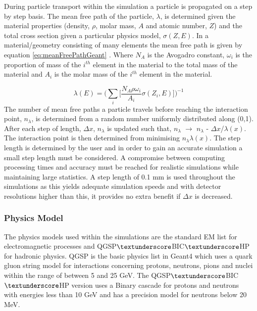 During particle transport within the simulation a particle is propagated on a step by step basis. The mean free path of the particle, $\lambda$, is determined given the material properties (density, $\rho$, molar mass, $A$ and atomic number, $Z$) and the total cross section given a particular physics model, $\sigma(Z,E)$. In a material/geometry consisting of many elements the mean free path is given by equation \ref{eq:meanFreePathGeant} \cite{geant4PhysicsManual}. Where $N_{A}$ is the Avogadro constant, $\omega_{i}$ is the proportion of mass of the $i^{th}$ element in the material to the total mass of the material and $A_{i}$ is the molar mass of the $i^{th}$ element in the material.

\begin{equation}
	\lambda(E) = \Bigg( \sum_{i} \big[ \frac{N_{A}\rho\omega_{i}}{A_{i}}\sigma(Z_{i},E) \big] \Bigg)^{-1}
	\label{eq:meanFreePathGeant}
\end{equation}
The number of mean free paths a particle travels before reaching the interaction point, $n_{\lambda}$, is determined from a random number uniformly distributed along (0,1). After each step of length, $\Delta$$x$, $n_{\lambda}$ is updated such that, $n_{\lambda}$ $\rightarrow$ $n_{\lambda}$ - $\Delta$$x$/$\lambda(x)$. The interaction point is then determined from minimising $n_{\lambda}$$\lambda(x)$. The step length is determined by the user and in order to gain an accurate simulation a small step length must be considered. A compromise between computing processing times and accuracy must be reached for realistic simulations while maintaining large statistics. A step length of 0.1 mm is used throughout the simulations as this yields adequate simulation speeds and with detector resolutions higher than this, it provides no extra benefit if $\Delta$$x$ is decreased. 

\subsubsection{Physics Model}
The physics models used within the simulations are the standard EM list for electromagnetic processes and QGSP$\textunderscore$BIC$\textunderscore$HP for hadronic physics. QGSP is the basic physics list in Geant4 which uses a quark gluon string model for interactions concerning protons, neutrons, pions and nuclei within the range of between 5 and 25 GeV. The QGSP$\textunderscore$BIC$\textunderscore$HP version uses a Binary cascade for protons and neutrons with energies less than 10 GeV and has a precision model for neutrons below 20 MeV.

